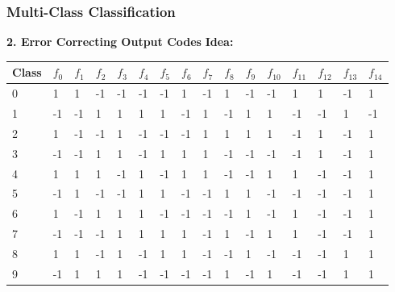 \documentclass[10pt, compress]{beamer}
\begin{document}
\begin{frame}
\frametitle{Multi-Class Classification}

\textbf{\alert{2. Error Correcting Output Codes}} 
\textbf{Idea: }

\begin{table}[ht!]
	\centering
	\label{Codewords}
	\begin{tabular}{|l|l|l|l|l|l|l|l|l|l|l|l|l|l|l|l|}
		\hline
		Class	& $f_0$ & $f_1$ & $f_2$ & $f_3$ & $f_4$ & $f_5$ & $f_6$ & $f_7$ & $f_8$ & $f_9$ & $f_{10}$ & $f_{11}$ & $f_{12}$ & $f_{13}$ & $f_{14}$ \\ \hline \hline
		0	& 1 & 1 & -1 & -1 & -1 & -1 & 1 & -1 & 1 & -1 & -1 & 1 & 1 & -1 & 1 \\ \hline
		1	& -1 & -1 & 1 & 1 & 1 & 1 & -1 & 1 & -1 & 1 & 1 & -1 & -1 & 1 & -1 \\ \hline
		2	& 1 & -1 & -1 & 1 & -1 & -1 & -1 & 1 & 1 & 1 & 1 & -1 & 1 & -1 & 1 \\ \hline
		3	& -1 & -1 & 1 & 1 & -1 & 1 & 1 & 1 & -1 & -1 & -1 & -1 & 1 & -1 & 1 \\ \hline
		4	& 1 & 1 & 1 & -1 & 1 & -1 & 1 & 1 & -1 & -1 & 1 & 1 & -1 & -1 & 1 \\ \hline
		5	& -1 & 1 & -1 & -1 & 1 & 1 & -1 & -1 & 1 & 1 & -1 & -1 & -1 & -1 & 1 \\ \hline
		6	& 1 & -1 & 1 & 1 & 1 & -1 & -1 & -1 & -1 & 1 & -1 & 1 & -1 & -1 & 1 \\ \hline
		7	& -1 & -1 & -1 & 1 & 1 & 1 & 1 & -1 & 1 & -1 & 1 & 1 & -1 & -1 & 1 \\ \hline
		8	& 1 & 1 & -1 & 1 & -1 & 1 & 1 & -1 & -1 & 1 & -1 & -1 & -1 & 1 & 1 \\ \hline
		9	& -1 & 1 & 1 & 1 & -1 & -1 & -1 & -1 & 1 & -1 & 1 & -1 & -1 & 1 & 1 \\ \hline
	\end{tabular}
\end{table}  

\end{frame}
\end{document}
